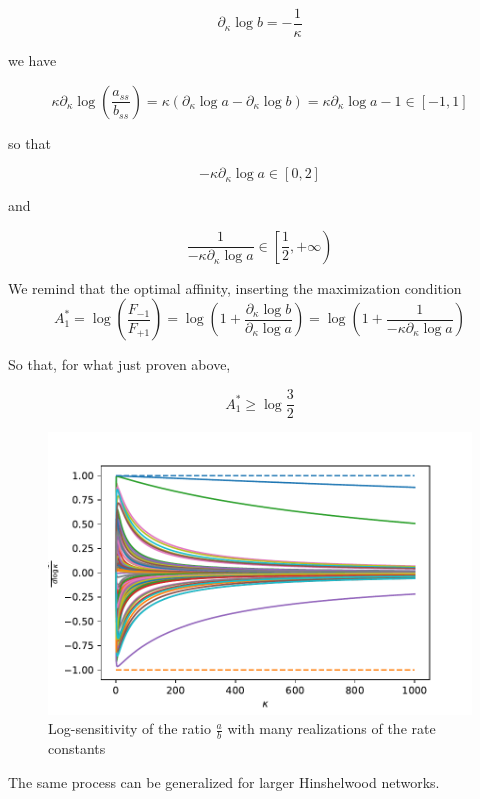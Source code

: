 \documentclass{article}
\begin{document}
	\begin{equation}
		\partial_{\kappa}\log b=-\frac{1}{\kappa}
	\end{equation}
	
	we have
	
	$$\kappa \partial_{\kappa}\log \left( \frac{a_{ss}}{b_{ss}}\right)=\kappa (\partial_{\kappa} \log a - \partial_{\kappa} \log b)=\kappa\partial_{\kappa} \log a-1 \in [-1,1]$$
	
	so that
	
	\begin{equation}
		-\kappa \partial_{\kappa} \log a\in [0,2]
	\end{equation}
	
	and 
	
	\begin{equation}
		\frac{1}{-\kappa \partial_{\kappa} \log a}\in \left[\frac{1}{2},+\infty\right)
	\end{equation}
	
	We remind that the optimal affinity, inserting the maximization condition $$A_1^*=\log\left(\frac{F_{-1}}{F_{+1}}\right)=\log\left(1+\frac{\partial_{\kappa}\log b}{\partial_{\kappa}\log a}\right)=\log\left(1+\frac{1}{-\kappa \partial_{\kappa}\log a}\right)$$
	
	So that, for what just proven above,
	
	$$A_1^* \ge \log \frac{3}{2}$$
	
	
	\begin{figure}[H]
		\begin{center}
			\includegraphics[width=0.7\linewidth]{sens.pdf}
			\caption{Log-sensitivity of the ratio $\frac{a}{b}$ with many realizations of the rate constants}
		\end{center}
	\end{figure}
	
	The same process can be generalized for larger Hinshelwood networks.
	
\end{document}

